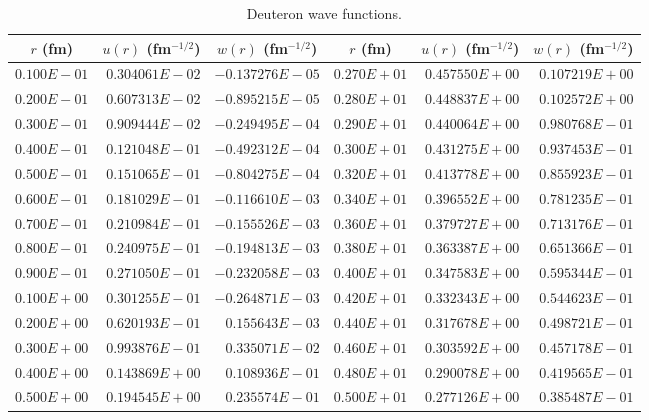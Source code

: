 \begin{table}
\caption{Deuteron wave functions.}
\begin{tabular}{rrrrrr}
\multicolumn{1}{c}{$r$ (fm)}  &
\multicolumn{1}{c}{$u(r)$ (fm$^{-1/2}$)} &
\multicolumn{1}{c}{$w(r)$ (fm$^{-1/2}$)} &
\multicolumn{1}{c}{$r$ (fm)}  &
\multicolumn{1}{c}{$u(r)$ (fm$^{-1/2}$)} &
\multicolumn{1}{c}{$w(r)$ (fm$^{-1/2}$)} 
\\ \hline 
 $   0.100E-01$ & $    0.304061E-02$ & $   -0.137276E-05$ & $   0.270E+01$ & $    0.457550E+00$ & $    0.107219E+00$  \\
 $   0.200E-01$ & $    0.607313E-02$ & $   -0.895215E-05$ & $   0.280E+01$ & $    0.448837E+00$ & $    0.102572E+00$  \\
 $   0.300E-01$ & $    0.909444E-02$ & $   -0.249495E-04$ & $   0.290E+01$ & $    0.440064E+00$ & $    0.980768E-01$  \\
 $   0.400E-01$ & $    0.121048E-01$ & $   -0.492312E-04$ & $   0.300E+01$ & $    0.431275E+00$ & $    0.937453E-01$  \\
 $   0.500E-01$ & $    0.151065E-01$ & $   -0.804275E-04$ & $   0.320E+01$ & $    0.413778E+00$ & $    0.855923E-01$  \\
 $   0.600E-01$ & $    0.181029E-01$ & $   -0.116610E-03$ & $   0.340E+01$ & $    0.396552E+00$ & $    0.781235E-01$  \\
 $   0.700E-01$ & $    0.210984E-01$ & $   -0.155526E-03$ & $   0.360E+01$ & $    0.379727E+00$ & $    0.713176E-01$  \\
 $   0.800E-01$ & $    0.240975E-01$ & $   -0.194813E-03$ & $   0.380E+01$ & $    0.363387E+00$ & $    0.651366E-01$  \\
 $   0.900E-01$ & $    0.271050E-01$ & $   -0.232058E-03$ & $   0.400E+01$ & $    0.347583E+00$ & $    0.595344E-01$  \\
 $   0.100E+00$ & $    0.301255E-01$ & $   -0.264871E-03$ & $   0.420E+01$ & $    0.332343E+00$ & $    0.544623E-01$  \\
 $   0.200E+00$ & $    0.620193E-01$ & $    0.155643E-03$ & $   0.440E+01$ & $    0.317678E+00$ & $    0.498721E-01$  \\
 $   0.300E+00$ & $    0.993876E-01$ & $    0.335071E-02$ & $   0.460E+01$ & $    0.303592E+00$ & $    0.457178E-01$  \\
 $   0.400E+00$ & $    0.143869E+00$ & $    0.108936E-01$ & $   0.480E+01$ & $    0.290078E+00$ & $    0.419565E-01$  \\
 $   0.500E+00$ & $    0.194545E+00$ & $    0.235574E-01$ & $   0.500E+01$ & $    0.277126E+00$ & $    0.385487E-01$  \\

\end{tabular}
\end{table}
